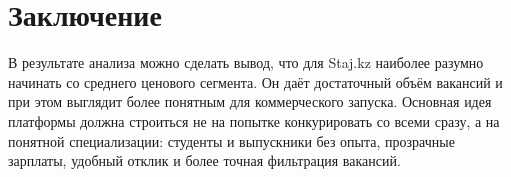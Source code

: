 \documentclass[12pt,a4paper]{article}
\begin{document}
\section*{Заключение}
В результате анализа можно сделать вывод, что для Staj.kz наиболее разумно начинать со среднего ценового сегмента. Он даёт достаточный объём вакансий и при этом выглядит более понятным для коммерческого запуска. Основная идея платформы должна строиться не на попытке конкурировать со всеми сразу, а на понятной специализации: студенты и выпускники без опыта, прозрачные зарплаты, удобный отклик и более точная фильтрация вакансий.
\end{document}
